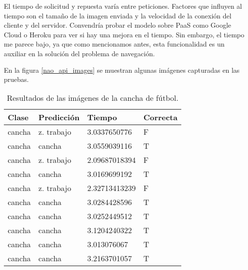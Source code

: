 El tiempo de solicitud y repuesta varía entre peticiones.
Factores que influyen al tiempo son el tamaño de la 
imagen enviada y la velocidad de la conexión del cliente
y del servidor. Convendría probar el modelo sobre PaaS
como Google Cloud o Heroku para ver si hay una mejora
en el tiempo. Sin embargo, el tiempo me parece 
bajo, ya que como mencionamos antes, esta funcionalidad
es un auxiliar en la solución del problema de navegación.


En la figura \ref{nao_api_images} se muestran algunas imágenes capturadas en las pruebas.


\begin{table}[!h]
\centering
\begin{tabular}{|l|l|l|l|}
\hline
Clase        & Predicción   & Tiempo        & Correcta \\ \hline
cancha & z. trabajo        & 3.0337650776 & F        \\ \hline
cancha & cancha & 3.0559039116 & T        \\ \hline
cancha & z. trabajo        & 2.09687018394 & F        \\ \hline
cancha & cancha & 3.0169699192 & T        \\ \hline
cancha & z. trabajo        & 2.32713413239 & F        \\ \hline
cancha & cancha & 3.0284428596 & T        \\ \hline
cancha & cancha & 3.0252449512 & T        \\ \hline
cancha & cancha & 3.1204240322 & T        \\ \hline
cancha & cancha & 3.013076067  & T        \\ \hline
cancha & cancha & 3.2163701057 & T        \\ \hline
\end{tabular}
\caption{Resultados de las imágenes de la cancha de fútbol.}
\label{table:soccer_nao_results}
\end{table}

